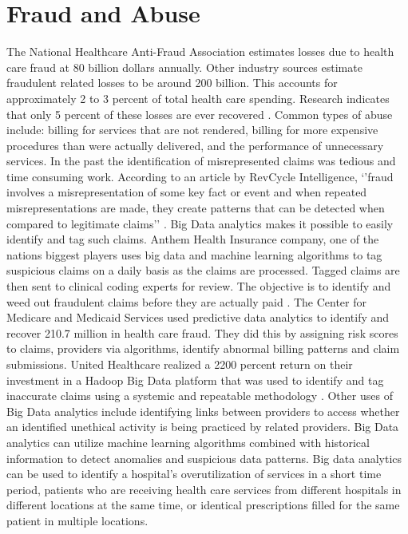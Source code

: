 \documentclass[sigconf]{acmart}
\begin{document}
\section{Fraud and Abuse}
The National Healthcare Anti-Fraud Association estimates losses due to health care fraud at 80 billion dollars annually. Other industry sources estimate fraudulent related losses to be around 200 billion. This accounts for approximately 2 to 3 percent of total health care spending. Research indicates that only 5 percent of these losses are ever recovered \cite{www-google-datameer}.
Common types of abuse include: billing for services that are not rendered, billing for more expensive procedures than were actually delivered, and the performance of unnecessary services. 
In the past the identification of misrepresented claims was tedious and time consuming work.  According to an article by RevCycle Intelligence, ‘’fraud involves a misrepresentation of some key fact or event and when repeated misrepresentations are made, they create patterns that can be detected when compared to legitimate claims’’ \cite{www-google-datameer}.  Big Data analytics makes it possible to easily identify and tag such claims. Anthem Health Insurance company, one of the nations biggest players uses big data and machine learning algorithms to tag suspicious claims on a daily basis as the claims are processed. Tagged claims are then sent to clinical coding experts for review. The objective is to identify and weed out fraudulent claims before they are actually paid \cite{www-google-datameer}.   
The Center for Medicare and Medicaid Services used predictive data analytics to identify and recover 210.7 million in health care fraud. They did this by assigning risk scores to claims, providers via algorithms, identify abnormal billing patterns and claim submissions.  United Healthcare realized a 2200 percent return on their investment in a Hadoop Big Data platform that was used to identify and tag inaccurate claims using a systemic and repeatable methodology \cite{www-google-McDonald}.
Other uses of Big Data analytics include identifying links between providers to access whether an identified unethical activity is being practiced by related providers.  Big Data analytics can utilize machine learning algorithms combined with historical information to detect anomalies and suspicious data patterns. Big data analytics can be used to identify a hospital’s overutilization of services in a short time period, patients who are receiving health care services from different hospitals in different locations at the same time, or identical prescriptions filled for the same patient in multiple locations. 
\end{document}
